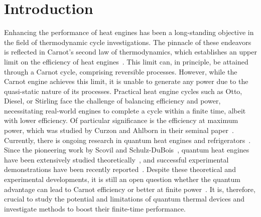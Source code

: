 \documentclass[aps,pra,twocolumn,showpacs,showkeys,groupedaddress,nobalancelastpage,nofootinbib,floatfix,superscriptaddress,longbibliography]{revtex4-2}
\begin{document}
\section{Introduction}
\label{sec:intro}
Enhancing the performance of heat engines has been a long-standing objective in the field of thermodynamic cycle investigations. The pinnacle of these endeavors is reflected in Carnot's second law of thermodynamics, which establishes an upper limit on the efficiency of heat engines~\cite{bhlitem57177}. This limit can, in principle, be attained through a Carnot cycle, comprising reversible processes. However, while the Carnot engine achieves this limit, it is unable to generate any power due to the quasi-static nature of its processes. Practical heat engine cycles such as Otto, Diesel, or Stirling face the challenge of balancing efficiency and power, necessitating real-world engines to complete a cycle within a finite time, albeit with lower efficiency. Of particular significance is the efficiency at maximum power, which was studied by Curzon and Ahlborn in their seminal paper~\cite{doi:10.1119/1.10023}.\\
Currently, there is ongoing research in quantum heat engines and refrigerators~\cite{doi:10.1146/annurev-physchem-040513-103724,Kosloff2017TheQH,tuncer2020,kurizki_kofman_2022,10.1088/2053-2571/ab21c6}. Since the pioneering work by Scovil and Schulz-DuBois~\cite{PhysRevLett.2.262}, quantum heat engines have been extensively studied theoretically~\cite{1979,doi:10.1063/1.446862,doi:10.1063/1.461951,10.1063/1.471453,10.1119/1.18197,PhysRevLett.88.050602,PhysRevLett.89.116801,doi:10.1126/science.1078955,PhysRevE.68.016101,PhysRevLett.93.140403,PhysRevE.70.046110,PhysRevE.72.056110,Rezek_2006,PhysRevE.76.031105,PhysRevE.77.041118,PhysRevLett.109.203006,PhysRevE.90.022102,Hardal2015,PhysRevE.95.032139,Turkpence_2017,PhysRevB.96.104304,PhysRevE.96.062120,Niedenzu2018,PhysRevE.97.062153,Naseem:19,PhysRevE.100.012109,PhysRevE.102.062123,Hamedani_Raja_2021,e24101458,Pozas-Kerstjens_2018,PhysRevA.106.L030201}, and successful experimental demonstrations have been recently reported~\cite{PhysRevLett.119.050602,PhysRevLett.122.110601,PhysRevLett.123.240601,Bouton2021,doi:10.1126/sciadv.abl7740,PhysRevA.106.022436,Zhang2022,e25020311}. Despite these theoretical and experimental developments, it is still an open question whether the quantum advantage can lead to Carnot efficiency or better at finite power~\cite{PhysRevLett.112.030602,Campisi2016,Kim2022}. It is, therefore, crucial to study the potential and limitations of quantum thermal devices and investigate methods to boost their finite-time performance.\\
\end{document}
